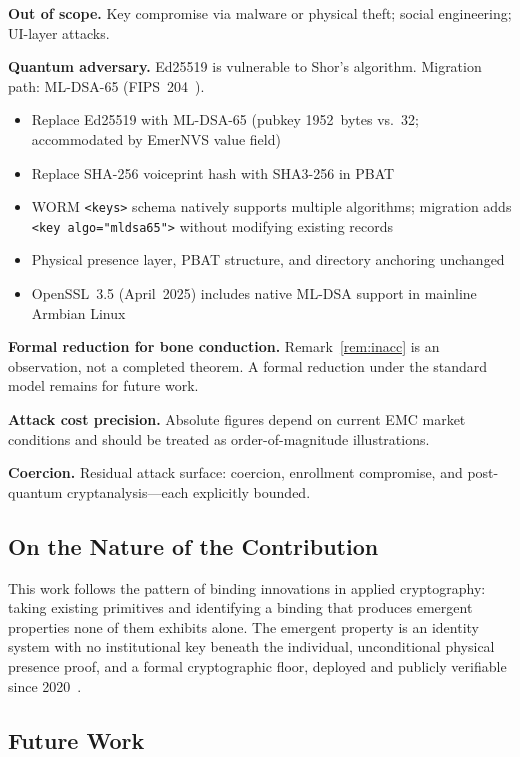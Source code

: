 \documentclass[12pt,a4paper]{article}
\begin{document}
\textbf{Out of scope.} Key compromise via malware or physical theft;
social engineering; UI-layer attacks.

\textbf{Quantum adversary.} Ed25519 is vulnerable to Shor's algorithm.
Migration path: ML-DSA-65 (FIPS~204~\cite{FIPS204}).
\begin{itemize}
  \item Replace Ed25519 with ML-DSA-65 (pubkey 1952~bytes vs.\ 32;
        accommodated by EmerNVS value field)
  \item Replace SHA-256 voiceprint hash with SHA3-256 in PBAT
  \item WORM \texttt{<keys>} schema natively supports multiple
        algorithms; migration adds \texttt{<key algo="mldsa65">}
        without modifying existing records
  \item Physical presence layer, PBAT structure, and directory anchoring
        unchanged
  \item OpenSSL~3.5 (April~2025) includes native ML-DSA support in
        mainline Armbian Linux
\end{itemize}

\textbf{Formal reduction for bone conduction.} Remark~\ref{rem:inacc}
is an observation, not a completed theorem. A formal reduction under the
standard model remains for future work.

\textbf{Attack cost precision.} Absolute figures depend on current EMC
market conditions and should be treated as order-of-magnitude
illustrations.

\textbf{Coercion.} Residual attack surface: coercion, enrollment
compromise, and post-quantum cryptanalysis---each explicitly bounded.

\subsection{On the Nature of the Contribution}

This work follows the pattern of binding innovations in applied
cryptography: taking existing primitives and identifying a binding that
produces emergent properties none of them exhibits alone. The emergent
property is an identity system with no institutional key beneath the
individual, unconditional physical presence proof, and a formal
cryptographic floor, deployed and publicly verifiable since
2020~\cite{NESSFiber}.

\subsection{Future Work}
\end{document}

